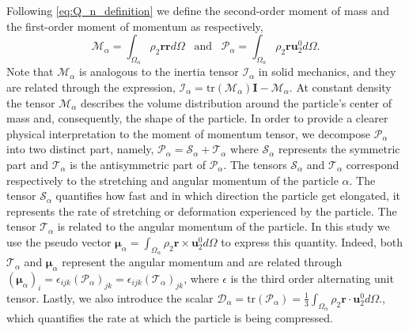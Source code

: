 Following \ref{eq:Q_n_definition} we define the second-order moment of mass and the first-order moment of momentum as respectively,
\begin{equation}
    \mathcal{M}_\alpha 
    = \int_{\Omega_\alpha} \rho_2 \textbf{r} \textbf{r} d\Omega
    \;\;\;\text{and}\;\;\;
    \mathcal{P}_\alpha 
    = \int_{\Omega_\alpha} \rho_2 \textbf{r} \textbf{u}_2^0 d\Omega.
    \label{eq:first_moment_of_momentum_def}
\end{equation}
Note that $\mathcal{M}_\alpha$ is analogous to the inertia tensor $\mathcal{I}_\alpha$ in solid mechanics, and they are related through the expression, $\mathcal{I}_\alpha = \text{tr}(\mathcal{M}_\alpha)\textbf{I} - \mathcal{M}_\alpha$.
At constant density the tensor $\mathcal{M}_\alpha$ describes the volume distribution around the particle's center of mass and, consequently, the shape of the particle.
In order to provide a clearer physical interpretation to the moment of momentum tensor, we decompose $\mathcal{P}_\alpha$ into two distinct part, namely,
$\mathcal{P}_\alpha = \mathcal{S}_\alpha+\mathcal{T}_\alpha$ where $\mathcal{S}_\alpha$ represents the symmetric part and $\mathcal{T}_\alpha$ is the antisymmetric part of $\mathcal{P}_\alpha$.
The tensors $\mathcal{S}_\alpha$ and $\mathcal{T}_\alpha$ correspond respectively to the stretching and angular momentum of the particle $\alpha$. 
The tensor $\mathcal{S}_\alpha$ quantifies how fast and in which direction the particle get elongated, it represents the rate of stretching or deformation experienced by the particle.
The tensor $\mathcal{T}_\alpha$ is related to the angular momentum of the particle. 
In this study we use the pseudo vector $\bm{\mu}_\alpha = \int_{\Omega_\alpha} \rho_2 \textbf{r} \times \textbf{u}_2^0 d\Omega$ to express this quantity. 
Indeed, both  $\mathcal{T}_\alpha$ and $\bm{\mu}_\alpha$ represent the angular momentum and are related through $(\bm{\mu}_\alpha)_i = \epsilon_{ijk} (\mathcal{P}_\alpha)_{jk}= \epsilon_{ijk} (\mathcal{T}_\alpha)_{jk}$, where $\epsilon$ is the third order alternating unit tensor. 
Lastly, we also introduce the scalar $\mathcal{D}_\alpha = \text{tr}(\mathcal{P}_\alpha) = \frac{1}{3}\int_{\Omega_\alpha} \rho_2 \textbf{r} \cdot \textbf{u}_2^0 d\Omega.$, which quantifies the rate at which the particle is being compressed.


